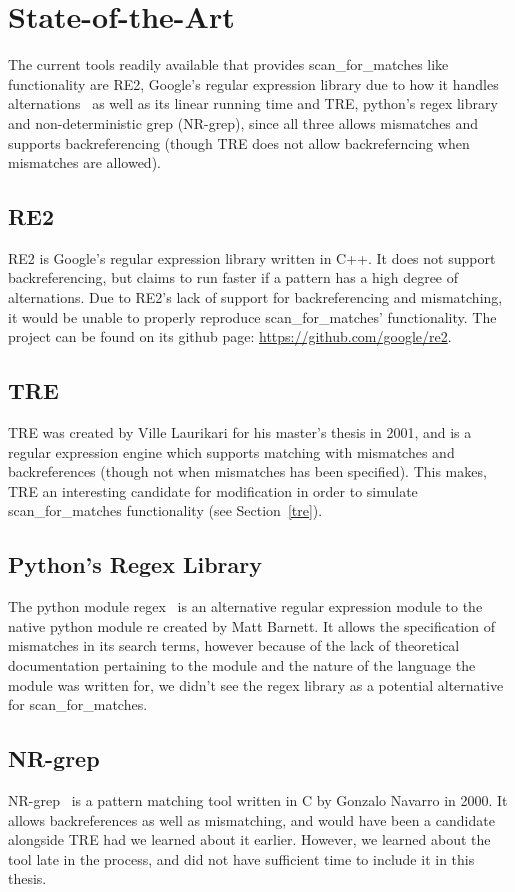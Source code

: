 \section{State-of-the-Art}
The current tools readily available that provides scan\_for\_matches like 
functionality are RE2, Google's regular expression library due to 
how it handles alternations~\cite{re2java} as well as its linear running time and TRE, 
python's regex library and non-deterministic grep (NR-grep), since all three 
allows mismatches and supports backreferencing (though TRE does not allow 
backreferncing when mismatches are allowed). %
 \subsection{RE2} %
 RE2 is Google's regular expression library written in C++. It does not 
 support backreferencing, but claims to run faster if a pattern has a high degree 
 of alternations. Due to RE2's lack of support for backreferencing and mismatching, 
 it would be unable to properly reproduce scan\_for\_matches' functionality. 
 The project can be found on its github page: \url{https://github.com/google/re2}.
 \subsection{TRE} %
 TRE was created by Ville Laurikari for his master's thesis in 
 2001\cite{LaurikariComplex}, and is a regular expression engine which supports 
 matching with mismatches and backreferences (though not when mismatches has 
 been specified). This makes, TRE an interesting candidate for modification in 
 order to simulate scan\_for\_matches functionality (see Section~\ref{tre}).
 \subsection{Python's Regex Library} %
 The python module regex~\cite{pythonregex} is an alternative regular expression 
 module to the native python module re created by Matt Barnett. It allows the 
 specification of mismatches in its search terms, however because of the lack 
 of theoretical documentation pertaining to the module and the nature of 
 the language the module was written for, we didn't see the regex library as 
 a potential alternative for scan\_for\_matches. 
 \subsection{NR-grep}
 NR-grep~\cite{Navarro00nr-grep:a} is a pattern matching tool written 
 in C by Gonzalo Navarro in 2000. It allows backreferences as well as mismatching, 
 and would have been a candidate alongside TRE had 
 we learned about it earlier. However, we learned about the tool 
 late in the process, and did not have sufficient time to include it in this thesis.
